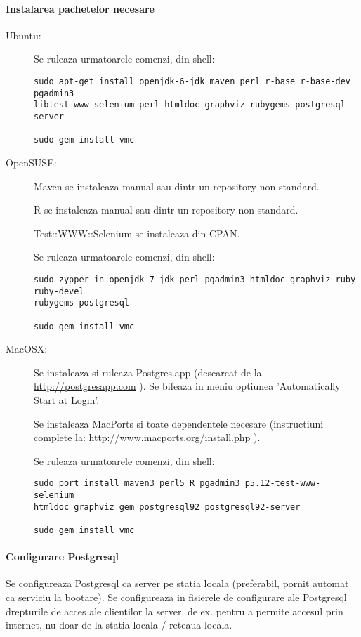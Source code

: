 \paragraph{Instalarea pachetelor necesare}
\begin{description}
\item[Ubuntu:]
Se ruleaza urmatoarele comenzi, din shell:
\begin{lstlisting}[breaklines=true]
sudo apt-get install openjdk-6-jdk maven perl r-base r-base-dev pgadmin3
libtest-www-selenium-perl htmldoc graphviz rubygems postgresql-server

sudo gem install vmc
\end{lstlisting}

\item[OpenSUSE:]
Maven se instaleaza manual sau dintr-un repository non-standard.

R se instaleaza manual sau dintr-un repository non-standard.

Test::WWW::Selenium se instaleaza din CPAN.

Se ruleaza urmatoarele comenzi, din shell:
\begin{lstlisting}[breaklines=true]
sudo zypper in openjdk-7-jdk perl pgadmin3 htmldoc graphviz ruby ruby-devel
rubygems postgresql

sudo gem install vmc
\end{lstlisting}

\item[MacOSX:]
Se instaleaza si ruleaza Postgres.app (descarcat de la \url{http://postgresapp.com} ).
Se bifeaza in meniu optiunea 'Automatically Start at Login'.

Se instaleaza MacPorts si toate dependentele necesare (instructiuni complete la:
\url{http://www.macports.org/install.php} ).

Se ruleaza urmatoarele comenzi, din shell:
\begin{lstlisting}[breaklines=true]
sudo port install maven3 perl5 R pgadmin3 p5.12-test-www-selenium
htmldoc graphviz gem postgresql92 postgresql92-server

sudo gem install vmc
\end{lstlisting}
\end{description}

\paragraph{Configurare Postgresql}
Se configureaza Postgresql ca server pe statia locala (preferabil, pornit
automat ca serviciu la bootare). 
Se configureaza in fisierele de configurare ale Postgresql drepturile
de acces ale clientilor la server, de ex. pentru a permite accesul prin
internet, nu doar de la statia locala / reteaua locala.

